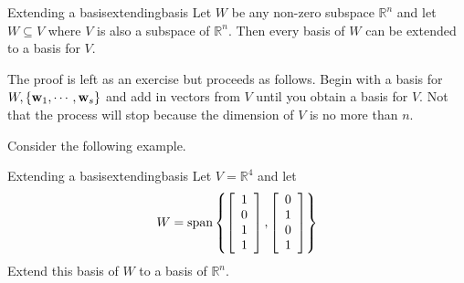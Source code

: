 \begin{theorem}{Extending a basis}{extendingbasis}
Let $W$ be any non-zero subspace $\mathbb{R}^{n}$ and let $W\subseteq V$
where $V$ is also a subspace of $\mathbb{R}^{n}$. Then every basis of $W$
can be extended to a basis for $V$.
\end{theorem}

The proof is left as an exercise but proceeds as follows. Begin with a basis for $W,\left\{ {\bf w}_{1},\cdots ,{\bf w}_{s}\right\} $ and add in vectors from $V$ until you obtain a basis for $V$.
Not that the process will stop because the dimension of $V$ is no more than $n$. 

Consider the following example.

\begin{example}{Extending a basis}{extendingbasis}
Let $V=\mathbb{R}^{4}$ and let 
\begin{equation*}
W=\mbox{span}\left\{ \left[
\begin{array}{c}
1 \\ 
0 \\ 
1 \\ 
1
\end{array}
\right] ,\left[ 
\begin{array}{c}
0 \\ 
1 \\ 
0 \\ 
1
\end{array}
\right] \right\}
\end{equation*}
Extend this basis of $W$ to a basis of $\mathbb{R}^{n}$.
\end{example}

